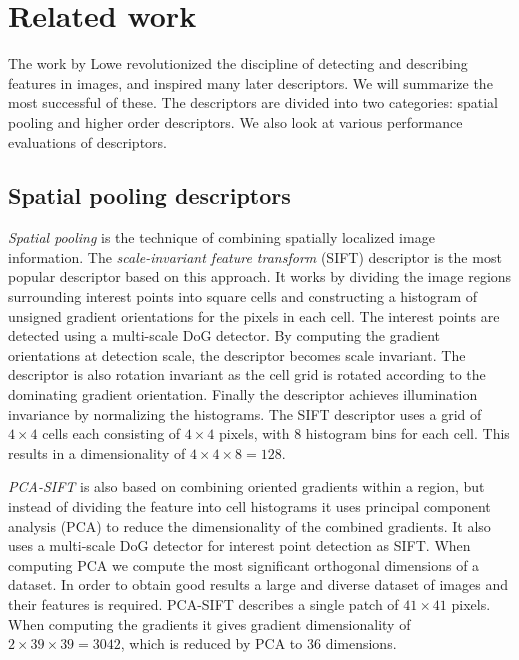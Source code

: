 \documentclass[../thesis.tex]{subfiles}
\begin{document}
\section{Related work}

The work by Lowe \cite{lowe2004distinctive} revolutionized the discipline
of detecting and describing features in images, and inspired many later
descriptors. We will summarize the most successful of these. The descriptors
are divided into two categories: spatial pooling and higher order descriptors.
We also look at various performance evaluations of descriptors.

\subsection{Spatial pooling descriptors}

\emph{Spatial pooling} is the technique of combining spatially localized
image information. The \emph{scale-invariant feature transform} (SIFT)
descriptor \cite{lowe2004distinctive} is the most popular descriptor based on
this approach. It works by dividing the image regions surrounding interest
points into square cells and constructing a histogram of unsigned gradient
orientations for the pixels in each cell. The interest points are detected
using a multi-scale DoG detector. By computing the gradient orientations
at detection scale, the descriptor becomes scale invariant. The descriptor
is also rotation invariant as the cell grid is rotated according to the
dominating gradient orientation. Finally the descriptor achieves illumination
invariance by normalizing the histograms. The SIFT descriptor uses a grid of
$4 \times 4$ cells each consisting of $4 \times 4$ pixels, with 8 histogram
bins for each cell. This results in a dimensionality of $4 \times 4 \times 8 =
128$.

\emph{PCA-SIFT} \cite{ke2004pca} is also based on combining oriented gradients
within a region, but instead of dividing the feature into cell histograms
it uses principal component analysis (PCA) to reduce the dimensionality
of the combined gradients. It also uses a multi-scale DoG detector for
interest point detection as SIFT. When computing PCA we compute the most
significant orthogonal dimensions of a dataset. In order to obtain good
results a large and diverse dataset of images and their features is required.
PCA-SIFT describes a single patch of $41 \times 41$ pixels. When computing
the gradients it gives gradient dimensionality of $2\times39\times39 = 3042$,
which is reduced by PCA to 36 dimensions.
\end{document}
